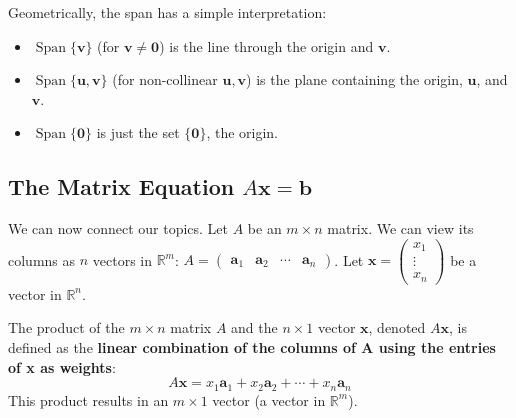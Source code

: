 \documentclass[oneside]{book}
\begin{document}
Geometrically, the span has a simple interpretation:
\begin{itemize}
    \item $\operatorname{Span}\{\mathbf{v}\}$ (for $\mathbf{v} \neq \mathbf{0}$) is the line through the origin and $\mathbf{v}$.
    \item $\operatorname{Span}\{\mathbf{u}, \mathbf{v}\}$ (for non-collinear $\mathbf{u}, \mathbf{v}$) is the plane containing the origin, $\mathbf{u}$, and $\mathbf{v}$.
    \item $\operatorname{Span}\{\mathbf{0}\}$ is just the set $\{\mathbf{0}\}$, the origin.
\end{itemize}
%

\subsection{The Matrix Equation $A\mathbf{x} = \mathbf{b}$}

We can now connect our topics.
Let $A$ be an $m \times n$ matrix. We can view its columns as $n$ vectors in $\mathbb{R}^m$:
$A = \begin{pmatrix} \mathbf{a}_1 & \mathbf{a}_2 & \cdots & \mathbf{a}_n \end{pmatrix}$.
Let $\mathbf{x} = \begin{pmatrix} x_1 \\ \vdots \\ x_n \end{pmatrix}$ be a vector in $\mathbb{R}^n$.

\begin{definition}
The product of the $m \times n$ matrix $A$ and the $n \times 1$ vector $\mathbf{x}$, denoted $A\mathbf{x}$, is defined as the \textbf{linear combination of the columns of A using the entries of x as weights}:
\[
A\mathbf{x} = x_1\mathbf{a}_1 + x_2\mathbf{a}_2 + \cdots + x_n\mathbf{a}_n
\]
This product results in an $m \times 1$ vector (a vector in $\mathbb{R}^m$).
\end{definition}
\end{document}

